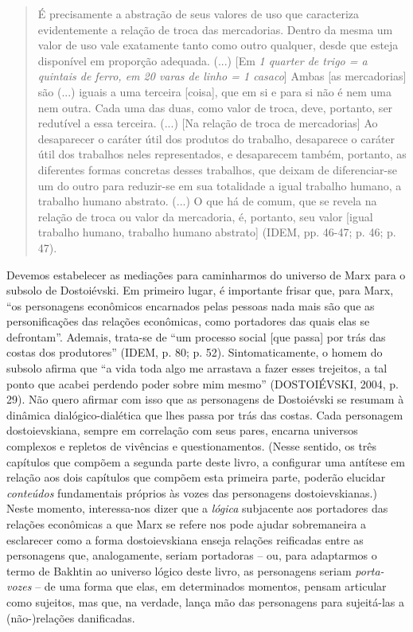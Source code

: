 \begin{quote}
É precisamente a abstração de seus valores de uso que caracteriza
evidentemente a relação de troca das mercadorias. Dentro da mesma um
valor de uso vale exatamente tanto como outro qualquer, desde que esteja
disponível em proporção adequada. (...) {[}Em \emph{1 quarter de trigo =
a quintais de ferro, em 20 varas de linho = 1 casaco}{]} Ambas {[}as
mercadorias{]} são (...) iguais a uma terceira {[}coisa{]}, que em si e
para si não é nem uma nem outra. Cada uma das duas, como valor de troca,
deve, portanto, ser redutível a essa terceira. (...) {[}Na relação de
troca de mercadorias{]} Ao desaparecer o caráter útil dos produtos do
trabalho, desaparece o caráter útil dos trabalhos neles representados, e
desaparecem também, portanto, as diferentes formas concretas desses
trabalhos, que deixam de diferenciar-se um do outro para reduzir-se em
sua totalidade a igual trabalho humano, a trabalho humano abstrato.
(...) O que há de comum, que se revela na relação de troca ou valor da
mercadoria, é, portanto, seu valor {[}igual trabalho humano, trabalho
humano abstrato{]} (IDEM, pp. 46-47; p. 46; p. 47).
\end{quote}

Devemos estabelecer as mediações para caminharmos do universo de Marx
para o subsolo de Dostoiévski. Em primeiro lugar, é importante frisar
que, para Marx, ``os personagens econômicos encarnados pelas pessoas
nada mais são que as personificações das relações econômicas, como
portadores das quais elas se defrontam''. Ademais, trata-se de ``um
processo social {[}que passa{]} por trás das costas dos produtores''
(IDEM, p. 80; p. 52). Sintomaticamente, o homem do subsolo afirma que
``a vida toda algo me arrastava a fazer esses trejeitos, a tal ponto que
acabei perdendo poder sobre mim mesmo'' (DOSTOIÉVSKI, 2004, p. 29). Não
quero afirmar com isso que as personagens de Dostoiévski se resumam à
dinâmica dialógico-dialética que lhes passa por trás das costas. Cada
personagem dostoievskiana, sempre em correlação com seus pares, encarna
universos complexos e repletos de vivências e questionamentos. (Nesse
sentido, os três capítulos que compõem a segunda parte deste livro, a
configurar uma antítese em relação aos dois capítulos que compõem esta
primeira parte, poderão elucidar \emph{conteúdos} fundamentais próprios
às vozes das personagens dostoievskianas.) Neste momento, interessa-nos
dizer que a \emph{lógica} subjacente aos portadores das relações
econômicas a que Marx se refere nos pode ajudar sobremaneira a
esclarecer como a forma dostoievskiana enseja relações reificadas entre
as personagens que, analogamente, seriam portadoras -- ou, para
adaptarmos o termo de Bakhtin ao universo lógico deste livro, as
personagens seriam \emph{porta-vozes} -- de uma forma que elas, em
determinados momentos, pensam articular como sujeitos, mas que, na
verdade, lança mão das personagens para sujeitá-las a (não-)relações
danificadas.

